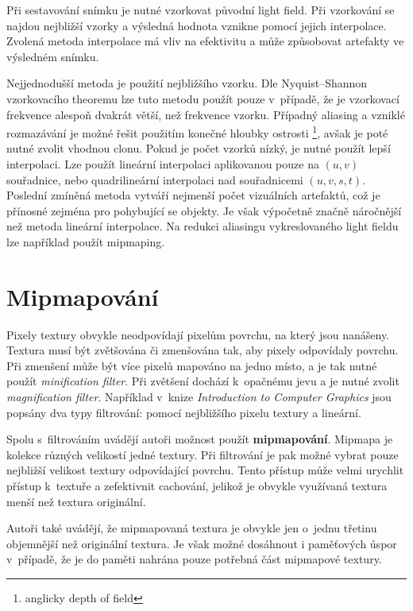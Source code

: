 Při sestavování snímku je nutné vzorkovat původní light field. Při vzorkování se najdou nejbližší vzorky a výsledná hodnota vznikne pomocí jejich interpolace. Zvolená metoda interpolace má vliv na efektivitu a může způsobovat artefakty ve výsledném snímku. 

Nejjednodušší metoda je použití nejbližšího vzorku. Dle Nyquist–Shannon vzorkovacího theoremu\cite{por2019nyquist} lze tuto metodu použít pouze v~případě, že je vzorkovací frekvence alespoň dvakrát větší, než frekvence vzorku. Případný aliasing a vzniklé rozmazávání je možné řešit použitím konečné hloubky ostrosti \footnote{anglicky depth of field}, avšak je poté nutné zvolit vhodnou clonu. Pokud je počet vzorků nízký, je nutné použít lepší interpolaci. Lze použít lineární interpolaci aplikovanou pouze na \((u,v)\) souřadnice, nebo quadrilineární interpolaci nad souřadnicemi \((u,v,s,t)\). Poslední zmíněná metoda vytváří nejmenší počet vizuálních artefaktů, což je přínosné zejména pro pohybující se objekty. Je však výpočetně značně náročnější než metoda lineární interpolace. Na redukci aliasingu vykreslovaného light fieldu lze například použít mipmaping.


\section{Mipmapování}
Pixely textury obvykle neodpovídají pixelům povrchu, na který jsou nanášeny. Textura musí být zvětšována či zmenšována tak, aby pixely odpovídaly povrchu. Při zmenšení může být více pixelů mapováno na jedno místo, a je tak nutné použít \emph{minification filter}. Při zvětšení dochází k~opačnému jevu a je nutné zvolit \emph{magnification  filter}. Například v~knize \emph{Introduction to Computer Graphics} \cite{foley1994introduction} jsou popsány dva typy filtrování: pomocí nejbližšího pixelu textury a lineární. 

\pagebreak

Spolu s~filtrováním uvádějí autoři možnost použít \textbf{mipmapování}. Mipmapa je kolekce různých velikostí jedné textury. Při filtrování je pak možné vybrat pouze nejbližší velikost textury odpovídající povrchu. Tento přístup může velmi urychlit přístup k~textuře a zefektivnit cachování, jelikož je obvykle využívaná textura menší než textura originální. 

Autoři také uvádějí, že mipmapovaná textura je obvykle jen o~jednu třetinu objemnější než originální textura. Je však možné dosáhnout i paměťových úspor v~případě, že je do paměti nahrána pouze potřebná část mipmapové textury. 

